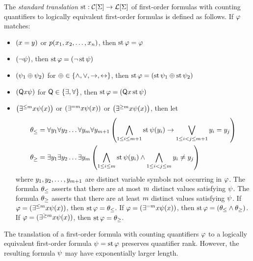 
The \emph{standard translation} $\operatorname{st} : \mathcal{C}[\mathrm{\Sigma}] \to \mathcal{L}[\mathrm{\Sigma}]$ of
first-order formulas with counting quantifiers to logically equivalent
first-order formulas is defined as follows. If $\varphi$ matches:
\begin{itemize}
  \item $(x = y)$ or $p(x_{1}, x_{2}, \dots, x_{n})$, then
  $\operatorname{st}\varphi = \varphi$
  \item $(\lnot\psi)$, then $\operatorname{st}\varphi = (\lnot\operatorname{st}\psi)$
  \item $(\psi_1 \oplus \psi_2)$ for $\oplus \in \left\{\land,\lor,\rightarrow,\leftrightarrow\right\}$, then
  $\operatorname{st}\varphi = (\operatorname{st}\psi_1 \oplus \operatorname{st}\psi_2)$
  \item $(\mathsf{Q}x \psi)$ for $\mathsf{Q} \in \left\{\exists, \forall\right\}$, then
  $\operatorname{st}\varphi = (\mathsf{Q}x \operatorname{st}\psi)$
  \item $\left(\exists^{\leq m}x \psi(x)\right)$ or
  $\left(\exists^{=m}x \psi(x)\right)$ or
  $\left(\exists^{\geq m}x \psi(x)\right)$, then let
  \begin{align*}
  \theta_\leq &= \forall y_{1} \forall y_{2} \dots \forall y_{m}
  \forall y_{m+1}
  \left(\bigwedge_{1 \leq i \leq m+1} \operatorname{st}\psi(y_{i}) \rightarrow
  \bigvee_{1 \leq i < j \leq m+1} y_{i} = y_{j}\right) \\
  \theta_\geq &= \exists y_{1} \exists y_{2} \dots \exists y_{m}
  \left(\bigwedge_{1 \leq i \leq m} \operatorname{st}\psi(y_{i}) \land
  \bigwedge_{1 \leq i < j \leq m} y_{i} \neq y_{j}\right)
  \end{align*}
  where $y_{1}, y_{2}, \dots, y_{m+1}$ are distinct variable symbols not
  occurring in $\varphi$. The formula $\theta_\leq$ asserts that there are at most
  $m$ distinct values satisfying $\psi$. The formula $\theta_\geq$ asserts
  that there are at least $m$ distinct values satisfying $\psi$.
  If $\varphi = (\exists^{\leq m}x \psi(x))$, then
  $\operatorname{st}\varphi = \theta_\leq$.
  If $\varphi = (\exists^{=m}x \psi(x))$, then
  $\operatorname{st}\varphi = \left(\theta_\leq \land \theta_\geq\right)$.
  If $\varphi = (\exists^{\geq m}x \psi(x))$, then
  $\operatorname{st}\varphi = \theta_\geq$.
\end{itemize}

\begin{remark}\label{rem:sttr-exp-size}
The translation of a first-order formula with counting quantifiers $\varphi$ to a
logically equivalent first-order formula $\psi = \operatorname{st}\varphi$ preserves
quantifier rank. However, the resulting formula $\psi$ may have exponentially
larger length.
\end{remark}